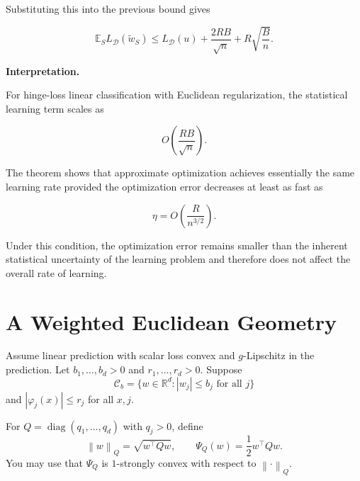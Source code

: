\documentclass[11pt]{article}
\newcommand{\E}{\mathbb{E}}
\newcommand{\R}{\mathbb{R}}
\newcommand{\norm}[1]{\left\lVert #1 \right\rVert}
\begin{document}
\begin{enumerate}
\begin{solutionbox}
Substituting this into the previous bound gives

\[
\boxed{
\E_S L_{\mathcal D}(\widetilde w_S)
\le
L_{\mathcal D}(u)
+
\frac{2RB}{\sqrt n}
+
R\sqrt{\frac{B}{n}}
}.
\]

\medskip

\textbf{Interpretation.}

For hinge-loss linear classification with Euclidean regularization, the statistical learning term scales as

\[
O\!\left(\frac{RB}{\sqrt n}\right).
\]

The theorem shows that approximate optimization achieves essentially the same learning rate provided the optimization error decreases at least as fast as

\[
\eta
=
O\!\left(\frac{R}{n^{3/2}}\right).
\]

Under this condition, the optimization error remains smaller than the inherent statistical uncertainty of the learning problem and therefore does not affect the overall rate of learning.

\end{solutionbox}

\end{enumerate}

\section{A Weighted Euclidean Geometry}

Assume linear prediction with scalar loss convex and $g$-Lipschitz in the prediction. Let $b_1,\ldots,b_d>0$ and $r_1,\ldots,r_d>0$. Suppose
\[
\mathcal C_b=\{w\in\R^d: |w_j|\le b_j\text{ for all }j\}
\]
and $|\varphi_j(x)|\le r_j$ for all $x,j$.

For $Q=\operatorname{diag}(q_1,\ldots,q_d)$ with $q_j>0$, define
\[
\norm{w}_Q=\sqrt{w^\top Qw},
\qquad
\Psi_Q(w)=\frac12w^\top Qw.
\]
You may use that $\Psi_Q$ is $1$-strongly convex with respect to $\norm{\cdot}_Q$.
\end{document}
